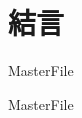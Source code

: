 \subsection{}


\section{結言}
\label{exp:conclusion}

 \expandafter\ifx\csname MasterFile\endcsname\relax
	\def\BibFile{hoge}
	
  \fi
  \expandafter\ifx\csname MasterFile\endcsname\relax

\fi
